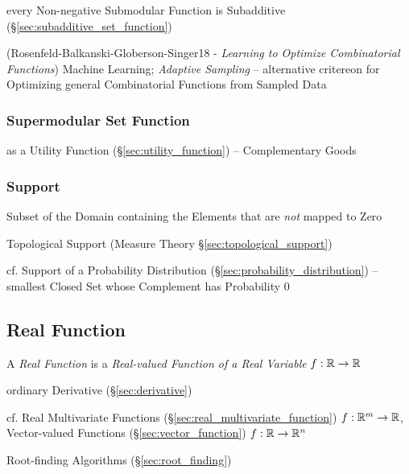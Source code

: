 every Non-negative Submodular Function is Subadditive
(\S\ref{sec:subadditive_set_function})

(Rosenfeld-Balkanski-Globerson-Singer18 - \emph{Learning to Optimize
  Combinatorial Functions}) Machine Learning; \emph{Adaptive Sampling} --
alternative critereon for Optimizing general Combinatorial Functions from
Sampled Data



\subsubsection{Supermodular Set Function}\label{sec:submodular_set_function}

as a Utility Function (\S\ref{sec:utility_function}) -- Complementary Goods



\subsubsection{Support}\label{sec:support}

Subset of the Domain containing the Elements that are \emph{not} mapped to Zero

Topological Support (Measure Theory \S\ref{sec:topological_support})

cf. Support of a Probability Distribution (\S\ref{sec:probability_distribution})
-- smallest Closed Set whose Complement has Probability $0$



\subsection{Real Function}\label{sec:real_function}

A \emph{Real Function} is a \emph{Real-valued Function of a Real Variable}
$f : \mathbb{R} \rightarrow \mathbb{R}$

ordinary Derivative (\S\ref{sec:derivative})

\fist cf. Real Multivariate Functions (\S\ref{sec:real_multivariate_function})
$f : \mathbb{R}^m \rightarrow \mathbb{R}$,
Vector-valued Functions (\S\ref{sec:vector_function}) $f : \mathbb{R} \rightarrow
\mathbb{R}^n$

\fist Root-finding Algorithms (\S\ref{sec:root_finding})



